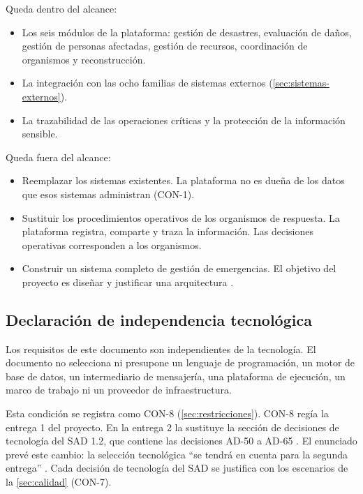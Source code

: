 \documentclass[11pt,letterpaper]{article}
\begin{document}
Queda dentro del alcance:

\begin{itemize}
  \item Los seis módulos de la plataforma: gestión de desastres, evaluación de daños, gestión de
        personas afectadas, gestión de recursos, coordinación de organismos y reconstrucción.
  \item La integración con las ocho familias de sistemas externos (\cref{sec:sistemas-externos}).
  \item La trazabilidad de las operaciones críticas y la protección de la información sensible.
\end{itemize}

Queda fuera del alcance:

\begin{itemize}
  \item Reemplazar los sistemas existentes. La plataforma no es dueña de los datos que esos
        sistemas administran (CON-1).
  \item Sustituir los procedimientos operativos de los organismos de respuesta. La plataforma
        registra, comparte y traza la información. Las decisiones operativas corresponden a los
        organismos.
  \item Construir un sistema completo de gestión de emergencias. El objetivo del proyecto es
        diseñar y justificar una arquitectura \cite{enunciado}.
\end{itemize}

\subsection{Declaración de independencia tecnológica}
\label{sec:agnostico}

Los requisitos de este documento son independientes de la tecnología. El documento no selecciona
ni presupone un lenguaje de programación, un motor de base de datos, un intermediario de mensajería,
una plataforma de ejecución, un marco de trabajo ni un proveedor de infraestructura.

Esta condición se registra como CON-8 (\cref{sec:restricciones}). CON-8 regía la entrega 1 del
proyecto. En la entrega 2 la sustituye la sección de decisiones de tecnología del SAD 1.2, que
contiene las decisiones AD-50 a AD-65 \cite{sad}. El enunciado prevé este cambio: la selección
tecnológica \enquote{se tendrá en cuenta para la segunda entrega} \cite{enunciado}. Cada decisión
de tecnología del SAD se justifica con los escenarios de la \cref{sec:calidad} (CON-7).
\end{document}
